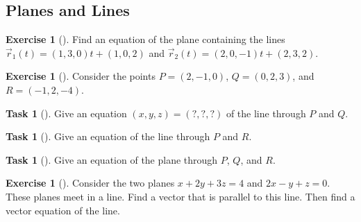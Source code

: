 \documentclass[10pt,]{book}
\theoremstyle{plain}
\theoremstyle{definition}
\theoremstyle{definition}
\theoremstyle{definition}
\theoremstyle{definition}
\newtheorem{exploration}[project]{Exercise}
\newtheorem{task}[project]{Task}
\theoremstyle{definition}
\numberwithin{equation}{section}
\begin{document}
\subsection[{Planes and Lines}]{Planes and Lines}\label{subsection-13}
\begin{exploration}[]\label{plane_equation_2_lines}
Find an equation of the plane containing the lines \(\vec r_1(t)=(1,3,0)t+(1,0,2)\) and \(\vec r_2(t)=(2,0,-1)t+(2,3,2)\).%
\end{exploration}
\begin{exploration}[]\label{prob_crossproduct_normalvector}
Consider the points \(P=(2,-1,0)\), \(Q=(0,2,3)\), and \(R=(-1,2,-4)\).%
\begin{task}[]\label{task-80}
Give an equation \((x,y,z)=(?,?,?)\) of the line through \(P\) and \(Q\).%
\end{task}
\begin{task}[]\label{task-81}
Give an equation of the line through \(P\) and \(R\).%
\end{task}
\begin{task}[]\label{task-82}
Give an equation of the plane through \(P\), \(Q\), and \(R\).%
\end{task}
\end{exploration}
\begin{exploration}[]\label{exploration-49}
Consider the two planes \(x+2y+3z=4\) and \(2x-y+z=0\). These planes meet in a line. Find a vector that is parallel to this line. Then find a vector equation of the line.%
\end{exploration}
\typeout{************************************************}
\typeout{************************************************}
\end{document}
